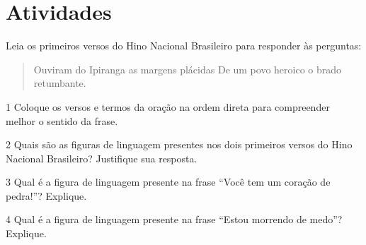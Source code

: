 
\section{Atividades}

Leia os primeiros versos do Hino Nacional Brasileiro para responder às perguntas:

\begin{quote} 

Ouviram do Ipiranga as margens plácidas
De um povo heroico o brado retumbante.

\end{quote}



\num{1} Coloque os versos e termos da oração na ordem direta para compreender 
melhor o sentido da frase. 


\num{2} Quais são as figuras de linguagem presentes nos dois primeiros versos do 
Hino Nacional Brasileiro? Justifique sua resposta.


\num{3} Qual é a figura de linguagem presente na frase ``Você tem um coração de pedra!''? 
Explique.


\num{4} Qual é a figura de linguagem presente na frase  ``Estou morrendo de medo''? Explique.

